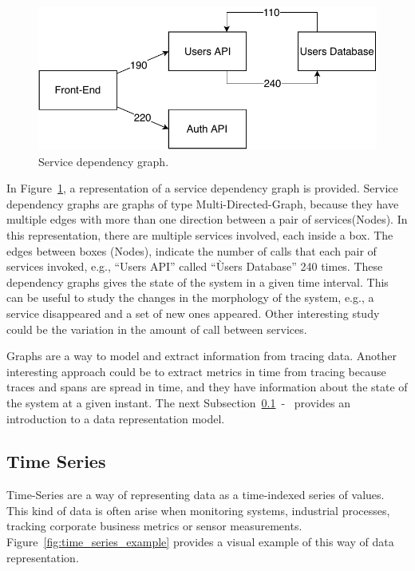 \begin{figure}[H]
    \centering
    \includegraphics[width=1.00\textwidth]{images/graph_service_representation.pdf}
    \caption{Service dependency graph.}
    \label{fig:service_dependency_graph}
\end{figure}

In Figure~\ref{fig:service_dependency_graph}, a representation of a service dependency graph is provided. Service dependency graphs are graphs of type Multi-Directed-Graph, because they have multiple edges with more than one direction between a pair of services(Nodes). In this representation, there are multiple services involved, each inside a box. The edges between boxes (Nodes), indicate the number of calls that each pair of services invoked, e.g., ``Users API'' called ``Ùsers Database'' 240 times. These dependency graphs gives the state of the system in a given time interval. This can be useful to study the changes in the morphology of the system, e.g., a service disappeared and a set of new ones appeared. Other interesting study could be the variation in the amount of call between services.

Graphs are a way to model and extract information from tracing data. Another interesting approach could be to extract metrics in time from tracing because traces and spans are spread in time, and they have information about the state of the system at a given instant. The next Subsection~\ref{subsec:time_series}~-~ provides an introduction to a data representation model.

\subsection{Time Series}
\label{subsec:time_series}

Time-Series are a way of representing data as a time-indexed series of values. This kind of data is often arise when monitoring systems, industrial processes, tracking corporate business metrics or sensor measurements. Figure~\ref{fig:time_series_example} provides a visual example of this way of data representation.

